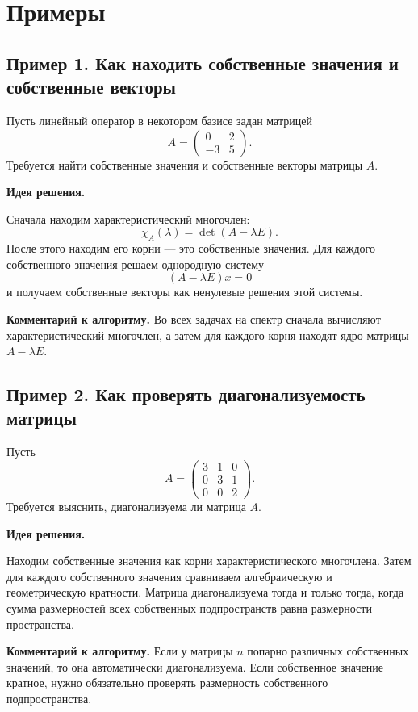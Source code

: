 \section*{Примеры}

\subsection*{Пример 1. Как находить собственные значения и собственные векторы}

Пусть линейный оператор в некотором базисе задан матрицей
\[
A=\begin{pmatrix}
0 & 2\\
-3 & 5
\end{pmatrix}.
\]
Требуется найти собственные значения и собственные векторы матрицы $A$.

\textbf{Идея решения.}

Сначала находим характеристический многочлен:
\[
\chi_A(\lambda)=\det(A-\lambda E).
\]
После этого находим его корни --- это собственные значения.  
Для каждого собственного значения решаем однородную систему
\[
(A-\lambda E)x=0
\]
и получаем собственные векторы как ненулевые решения этой системы.

\medskip
\noindent
\textbf{Комментарий к алгоритму.}
Во всех задачах на спектр сначала вычисляют характеристический многочлен, а затем для каждого корня находят ядро матрицы $A-\lambda E$.

\subsection*{Пример 2. Как проверять диагонализуемость матрицы}

Пусть
\[
A=\begin{pmatrix}
3 & 1 & 0\\
0 & 3 & 1\\
0 & 0 & 2
\end{pmatrix}.
\]
Требуется выяснить, диагонализуема ли матрица $A$.

\textbf{Идея решения.}

Находим собственные значения как корни характеристического многочлена. Затем для каждого собственного значения сравниваем алгебраическую и геометрическую кратности.  
Матрица диагонализуема тогда и только тогда, когда сумма размерностей всех собственных подпространств равна размерности пространства.

\medskip
\noindent
\textbf{Комментарий к алгоритму.}
Если у матрицы $n$ попарно различных собственных значений, то она автоматически диагонализуема. Если собственное значение кратное, нужно обязательно проверять размерность собственного подпространства.

